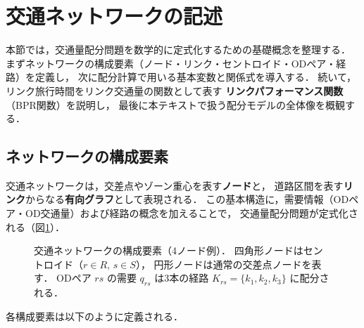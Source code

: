 
\section{交通ネットワークの記述}
\label{sec:ch1-network}

本節では，交通量配分問題を数学的に定式化するための基礎概念を整理する．
まずネットワークの構成要素（ノード・リンク・セントロイド・ODペア・経路）を定義し，
次に配分計算で用いる基本変数と関係式を導入する．
続いて，リンク旅行時間をリンク交通量の関数として表す
\textbf{リンクパフォーマンス関数}（BPR関数）を説明し，
最後に本テキストで扱う配分モデルの全体像を概観する．

\subsection{ネットワークの構成要素}
\label{subsec:network-elements}

交通ネットワークは，交差点やゾーン重心を表す\textbf{ノード}と，
道路区間を表す\textbf{リンク}からなる\textbf{有向グラフ}として表現される\cite{土木学会1998}．
この基本構造に，需要情報（ODペア・OD交通量）および経路の概念を加えることで，
交通量配分問題が定式化される（図\ref{fig:network-example}）．

\begin{figure}[hbtp]
  \centering
  
  \caption{交通ネットワークの構成要素（4ノード例）．
           四角形ノードはセントロイド（$r \in R,\, s \in S$），
           円形ノードは通常の交差点ノードを表す．
           ODペア $rs$ の需要 $q_{rs}$ は3本の経路 $K_{rs} = \{k_1, k_2, k_3\}$ に配分される．}
  \label{fig:network-example}
\end{figure}

各構成要素は以下のように定義される\cite{土木学会1998,Sheffi1985}．

